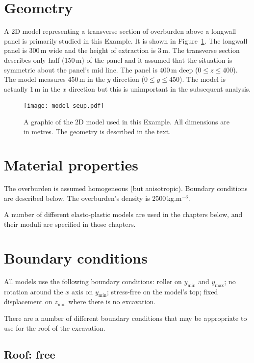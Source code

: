 \documentclass[]{scrreprt}
\begin{document}
\section{Geometry}

A 2D model representing a transverse section of overburden above a
longwall panel is primarily studied in this Example.  It is shown in
Figure~\ref{model_setup.fig}.  The longwall panel is 300\,m wide and the height of
extraction is 3\,m.  The transverse section describes only half
(150\,m) of the panel and it assumed that the situation is symmetric
about the panel's mid line.  The panel is 400\,m deep ($0\leq z\leq 400$).  The model
measures 450\,m in the $y$ direction ($0\leq y\leq 450$).  The model
is actually 1\,m in the $x$ direction but this is unimportant in the
subsequent analysis.

\begin{figure}[htb]
\begin{center}
\texttt{[image: model\_seup.pdf]}
\caption{A graphic of the 2D model used in this Example.  All
  dimensions are in metres.  The geometry is described in the text.}
\label{model_setup.fig}
\end{center}
\end{figure}

\section{Material properties}

The overburden is assumed homogeneous (but
anisotropic).  Boundary conditions are described below.  The
overburden's density is 2500\,kg.m$^{-3}$.

A number of different elasto-plastic models are used in the chapters
below, and their moduli are specified in those chapters.

\section{Boundary conditions}

All models use the following boundary conditions: roller on
$y_{\mathrm{min}}$ and $y_{\mathrm{max}}$; no rotation around the $x$
axis on $y_{\mathrm{min}}$; stress-free on the model's top; fixed
displacement on $z_{\mathrm{min}}$
where there is no excavation.

There are a number of different boundary conditions that may be
appropriate to use for the roof of the excavation.

\subsection{Roof: free}
\label{free.roof.sec}
\end{document}
